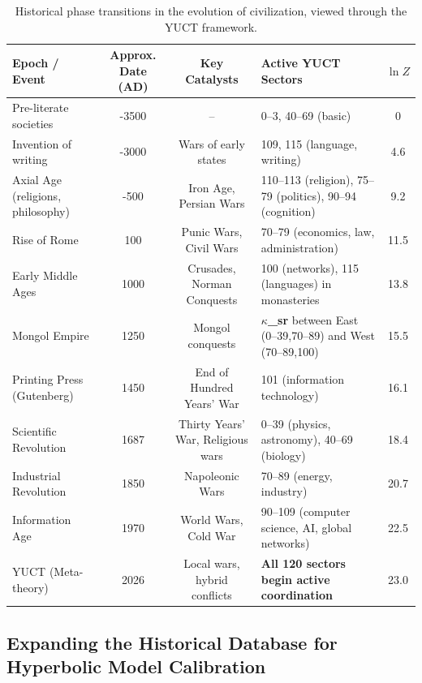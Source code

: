 \documentclass[12pt,a4paper]{article}
\theoremstyle{remark}
\begin{document}
	\begin{table}[htbp]
		\centering
		\caption{Historical phase transitions in the evolution of civilization, viewed through the YUCT framework.}
		\label{tab:historical-transitions}
		\small
		\begin{tabular}{p{2.2cm} c c p{5.5cm} c}
			\toprule
			\textbf{Epoch / Event} & \textbf{Approx. Date (AD)} & \textbf{Key Catalysts} & \textbf{Active YUCT Sectors} & $\ln Z$ \\
			\midrule
			Pre-literate societies & -3500 & – & 0–3, 40–69 (basic) & 0 \\
			Invention of writing & -3000 & Wars of early states & 109, 115 (language, writing) & 4.6 \\
			Axial Age (religions, philosophy) & -500 & Iron Age, Persian Wars & 110–113 (religion), 75–79 (politics), 90–94 (cognition) & 9.2 \\
			Rise of Rome & 100 & Punic Wars, Civil Wars & 70–79 (economics, law, administration) & 11.5 \\
			Early Middle Ages & 1000 & Crusades, Norman Conquests & 100 (networks), 115 (languages) in monasteries & 13.8 \\
			Mongol Empire & 1250 & Mongol conquests & \textbf{$\kappa$\_sr} between East (0–39,70–89) and West (70–89,100) & 15.5 \\
			Printing Press (Gutenberg) & 1450 & End of Hundred Years' War & 101 (information technology) & 16.1 \\
			Scientific Revolution & 1687 & Thirty Years' War, Religious wars & 0–39 (physics, astronomy), 40–69 (biology) & 18.4 \\
			Industrial Revolution & 1850 & Napoleonic Wars & 70–89 (energy, industry) & 20.7 \\
			Information Age & 1970 & World Wars, Cold War & 90–109 (computer science, AI, global networks) & 22.5 \\
			YUCT (Meta-theory) & 2026 & Local wars, hybrid conflicts & \textbf{All 120 sectors begin active coordination} & 23.0 \\
			\bottomrule
		\end{tabular}
	\end{table}
	
	\subsection{Expanding the Historical Database for Hyperbolic Model Calibration}
	\label{subsec:historical-data}
	
\end{document}
